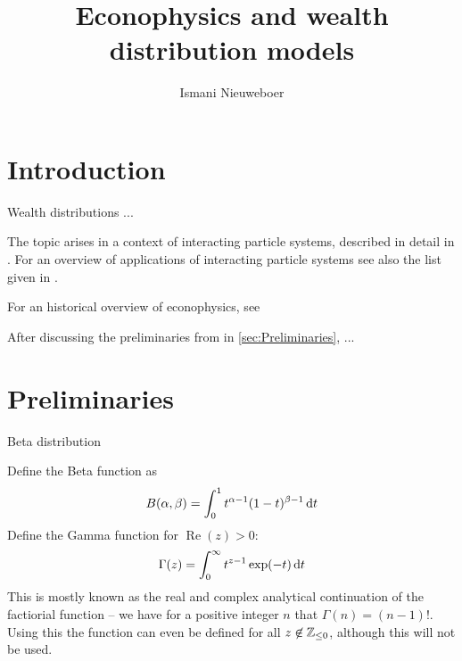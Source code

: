 \documentclass{article}
\title{Econophysics and wealth distribution models}
\author{Ismani Nieuweboer}
\begin{document}
\maketitle











\section*{Introduction}
Wealth distributions ...

The topic arises in a context of interacting particle systems, described in detail in  \cite{liggett2012interacting, liggett2013stochastic}. For an overview of applications of interacting particle systems see also the list given in \cite{frankredig2014}.

For an historical overview of econophysics, see \cite{2008arXiv0802.1416D, 2011arXiv1108.0977S}

After discussing the preliminaries from \cite{frankredig2014} in \autoref{sec:Preliminaries}, ...


\section{Preliminaries}%
Beta distribution

Define the Beta function as
\[
B(\alpha, \beta)
= \int_{0}^{1} t^{\alpha-1} (1-t)^{\beta-1} \mathop{}\!\mathrm{d} t
\]
Define the Gamma function for $\operatorname*{Re}(z) > 0$:
\[
\Gamma(z)
= \int_{0}^{\infty} t^{z-1} \exp(-t) \mathop{}\!\mathrm{d} t
\]
This is mostly known as the real and complex analytical continuation of the factiorial function -- we have for a positive integer $n$ that $\Gamma(n) = (n-1)!$. Using this the function can even be defined for all $z \not \in \mathbb{Z}_{\le 0}$, although this will not be used.
\end{document}
